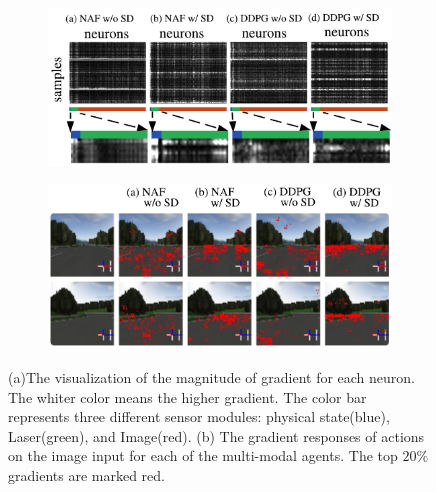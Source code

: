 \documentclass[../thesis.tex]{subfiles}
\begin{document}
\begin{figure}[t]
    \centering
    \begin{subfigure}[b]{0.48\linewidth}
        \includegraphics[width=\columnwidth]{./MultimodalDRL/fig/grad2_crop.png}
        \subcaption{}
        \label{fig:grad_exp}
    \end{subfigure}
    \begin{subfigure}[b]{0.48\linewidth}
        \includegraphics[width=\columnwidth]{./MultimodalDRL/fig/grad_image_new.png}
        \subcaption{}
        \label{fig:grad_exp_img}
    \end{subfigure}
    \caption{(a)The visualization of the magnitude of gradient for each neuron. The whiter color means the higher gradient. The color bar represents three different sensor modules: physical state(blue), Laser(green), and Image(red). (b) The gradient responses of actions on the image input for each of the multi-modal agents. The top $20\%$ gradients are marked red.}
    \label{fig:grad_exp_all}
\end{figure}
\end{document}
